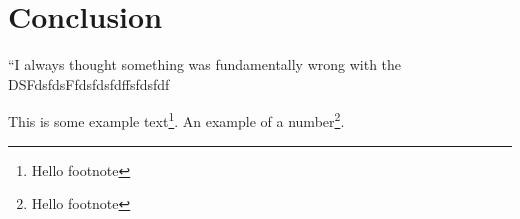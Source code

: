 \documentclass{article}
\begin{document}
\section{Conclusion}
``I always thought something was fundamentally wrong with the \\
DSFdsfdsFfdsfdsfdffsfdsfdf



This is some example text\footnote{\label{myfootnote}Hello footnote}.
An example of a number\footnote{\label{myfootnote}Hello footnote}.
\end{document}

